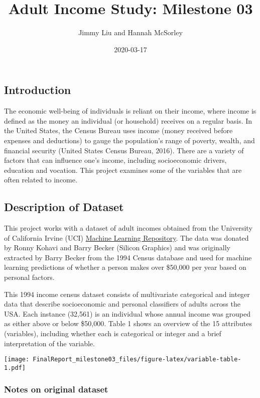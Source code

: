 \documentclass[]{article}
\title{Adult Income Study: Milestone 03}
\author{Jimmy Liu and Hannah McSorley}
\date{2020-03-17}
\begin{document}
\maketitle

\hypertarget{introduction}{%
\subsection{Introduction}\label{introduction}}

The economic well-being of individuals is reliant on their income, where
income is defined as the money an individual (or household) receives on
a regular basis. In the United States, the Census Bureau uses income
(money received before expenses and deductions) to gauge the
population's range of poverty, wealth, and financial security (United
States Census Bureau, 2016). There are a variety of factors that can
influence one's income, including socioeconomic drivers, education and
vocation. This project examines some of the variables that are often
related to income.

\hypertarget{description-of-dataset}{%
\subsection{Description of Dataset}\label{description-of-dataset}}

This project works with a dataset of adult incomes obtained from the
University of California Irvine (UCI)
\href{https://archive.ics.uci.edu/ml/datasets/adult}{Machine Learning
Repository}. The data was donated by Ronny Kohavi and Barry Becker
(Silicon Graphics) and was originally extracted by Barry Becker from the
1994 Census database and used for machine learning predictions of
whether a person makes over \$50,000 per year based on personal factors.

This 1994 income census dataset consists of multivariate categorical and
integer data that describe socioeconomic and personal classifiers of
adults across the USA. Each instance (32,561) is an individual whose
annual income was grouped as either above or below \$50,000. Table 1
shows an overview of the 15 attributes (variables), including whether
each is categorical or integer and a brief interpretation of the
variable.

\texttt{[image: FinalReport\_milestone03\_files/figure-latex/variable-table-1.pdf]}

\hypertarget{notes-on-original-dataset}{%
\subsubsection{Notes on original
dataset}\label{notes-on-original-dataset}}
\end{document}
